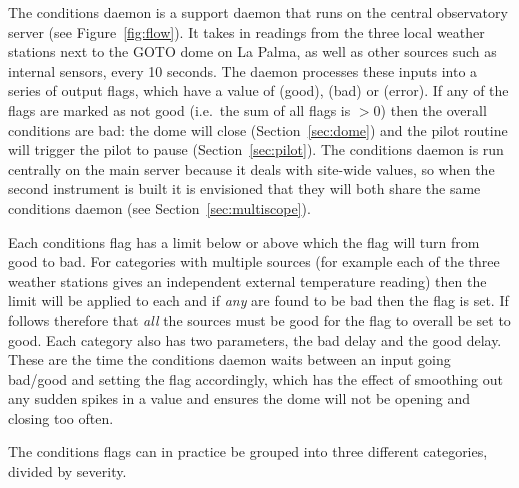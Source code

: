 \begin{colsection}
\begin{colsection}
The conditions daemon is a support daemon that runs on the central observatory server (see Figure~\ref{fig:flow}). It takes in readings from the three local weather stations next to the GOTO dome on La Palma, as well as other sources such as internal sensors, every 10 seconds. The daemon processes these inputs into a series of output flags, which have a value of  (good),  (bad) or  (error). If any of the flags are marked as not good (i.e.\ the sum of all flags is $>0$) then the overall conditions are bad: the dome will close (Section~\ref{sec:dome}) and the pilot  routine will trigger the pilot to pause (Section~\ref{sec:pilot}). The conditions daemon is run centrally on the main server because it deals with site-wide values, so when the second instrument is built it is envisioned that they will both share the same conditions daemon (see Section~\ref{sec:multiscope}).

Each conditions flag has a limit below or above which the flag will turn from good to bad. For categories with multiple sources (for example each of the three weather stations gives an independent external temperature reading) then the limit will be applied to each and if \textit{any} are found to be bad then the flag is set. If follows therefore that \textit{all} the sources must be good for the flag to overall be set to good. Each category also has two parameters, the bad delay and the good delay. These are the time the conditions daemon waits between an input going bad/good and setting the flag accordingly, which has the effect of smoothing out any sudden spikes in a value and ensures the dome will not be opening and closing too often.

The conditions flags can in practice be grouped into three different categories, divided by severity.


\end{colsection}
\end{colsection}
